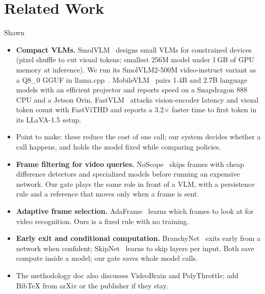 \section{Related Work}
\label{sec:related}
\begin{notes}{Shawn}
\begin{itemize}\setlength\itemsep{0pt}
\item \textbf{Compact VLMs.} SmolVLM~\cite{marafioti2025smolvlm} designs small VLMs for constrained devices (pixel shuffle to cut visual tokens; smallest 256M model under 1\,GB of GPU memory at inference). We run its SmolVLM2-500M video-instruct variant as a Q8\_0 GGUF in llama.cpp~\cite{llamacpp}. MobileVLM~\cite{chu2023mobilevlm} pairs 1.4B and 2.7B language models with an efficient projector and reports speed on a Snapdragon 888 CPU and a Jetson Orin. FastVLM~\cite{vasu2025fastvlm} attacks vision-encoder latency and visual token count with FastViTHD and reports a 3.2$\times$ faster time to first token in its LLaVA-1.5 setup.
\item Point to make: these reduce the cost of one call; our system decides whether a call happens, and holds the model fixed while comparing policies.
\item \textbf{Frame filtering for video queries.} NoScope~\cite{kang2017noscope} skips frames with cheap difference detectors and specialized models before running an expensive network. Our gate plays the same role in front of a VLM, with a persistence rule and a reference that moves only when a frame is sent.
\item \textbf{Adaptive frame selection.} AdaFrame~\cite{wu2019adaframe} learns which frames to look at for video recognition. Ours is a fixed rule with no training.
\item \textbf{Early exit and conditional computation.} BranchyNet~\cite{teerapittayanon2017branchynet} exits early from a network when confident; SkipNet~\cite{wang2018skipnet} learns to skip layers per input. Both save compute inside a model; our gate saves whole model calls.
\item The methodology doc also discusses VideoBrain and PolyThrottle; add BibTeX from arXiv or the publisher if they stay.
\end{itemize}
\end{notes}
